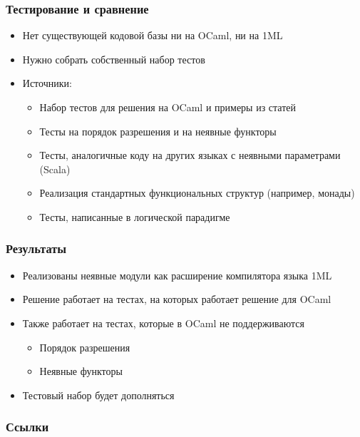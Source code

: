 \documentclass{beamer}
\begin{document}
\begin{frame}\frametitle{Тестирование и сравнение}
\begin{itemize}
  \item Нет существующей кодовой базы ни на OCaml, ни на 1ML
  \item Нужно собрать собственный набор тестов
  \item Источники:
  \begin{itemize}
    \item Набор тестов для решения на OCaml и примеры из статей
    \item Тесты на порядок разрешения и на неявные функторы
    \item Тесты, аналогичные коду на других языках с неявными параметрами (Scala)
    \item Реализация стандартных функциональных структур (например, монады)
    \item Тесты, написанные в логической парадигме
  \end{itemize}
\end{itemize}
\end{frame}

\begin{frame}\frametitle{Результаты}
\begin{itemize}
    \item Реализованы неявные модули как расширение компилятора языка 1ML
    \item Решение работает на тестах, на которых работает решение для OCaml
    \item Также работает на тестах, которые в OCaml не поддерживаются
    \begin{itemize}
        \item Порядок разрешения
        \item Неявные функторы
    \end{itemize}
    \item Тестовый набор будет дополняться 
\end{itemize}
\end{frame}

\appendix

\begin{frame}[allowframebreaks]\frametitle{Ссылки}
\printbibliography
\end{frame}
\end{document}
